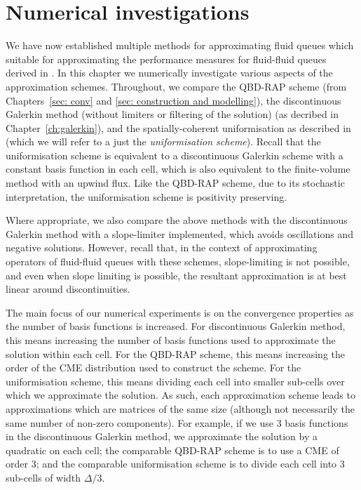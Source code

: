 \chapter{Numerical investigations\label{sec: numerics}}
We have now established multiple methods for approximating fluid queues which suitable for approximating the performance measures for fluid-fluid queues derived in \cite{bo2014}. In this chapter we numerically investigate various aspects of the approximation schemes. Throughout, we compare the QBD-RAP scheme (from Chapters~\ref{sec: conv} and \ref{sec: construction and modelling}), the discontinuous Galerkin method (without limiters or filtering of the solution) (as decribed in Chapter~\ref{ch:galerkin}), and the spatially-coherent uniformisation as described in \cite{bo2013} (which we will refer to a just the \emph{uniformisation scheme}). Recall that the uniformisation scheme is equivalent to a discontinuous Galerkin scheme with a constant basis function in each cell, which is also equivalent to the finite-volume method with an upwind flux. Like the QBD-RAP scheme, due to its stochastic interpretation, the uniformisation scheme is positivity preserving. 


Where appropriate, we also compare the above methods with the discontinuous Galerkin method with a slope-limiter implemented, which avoids oscillations and negative solutions. However, recall that, in the context of approximating operators of fluid-fluid queues with these schemes, slope-limiting is not possible, and even when slope limiting is possible, the resultant approximation is at best linear around discontinuities. 

The main focus of our numerical experiments is on the convergence properties as the number of basis functions is increased. For discontinuous Galerkin method, this means increasing the number of basis functions used to approximate the solution within each cell. For the QBD-RAP scheme, this means increasing the order of the CME distribution used to construct the scheme. For the uniformisation scheme, this means dividing each cell into smaller sub-cells over which we approximate the solution. As such, each approximation scheme leads to approximations which are matrices of the same size (although not necessarily the same number of non-zero components). For example, if we use 3 basis functions in the discontinuous Galerkin method, we approximate the solution by a quadratic on each cell; the comparable QBD-RAP scheme is to use a CME of order 3; and the comparable uniformisation scheme is to divide each cell into 3 sub-cells of width \(\Delta/3\). 

